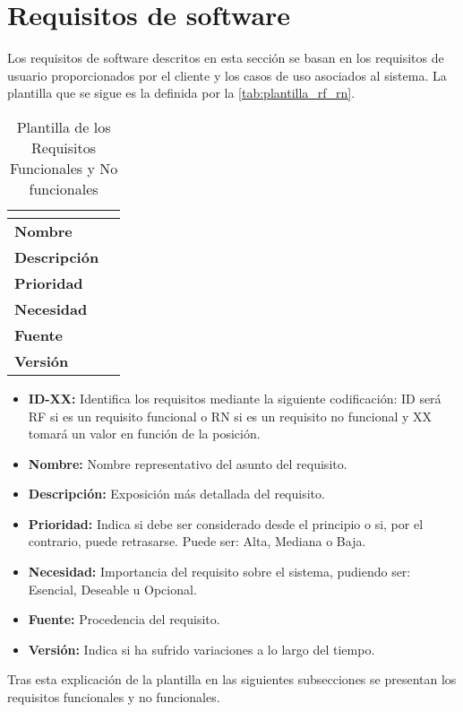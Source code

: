 \section{Requisitos de software}\label{sec:requisitos-de-software}
Los requisitos de software descritos en esta sección se basan en los requisitos de usuario proporcionados por el cliente y los casos de uso asociados al sistema. La plantilla que se sigue es la definida por la \autoref{tab:plantilla_rf_rn}.
\begin{table}[H]
	\caption{Plantilla de los Requisitos Funcionales y No funcionales}
	\label{tab:plantilla_rf_rn}
	\begin{tabular}{|l|p{}|}
		\hline
		\multicolumn{2}{|c|}{\cellcolor[HTML]{BFBFBF}{\color[HTML]{000000} \textbf{ID-XX}}} \\ \hline
		\textbf{Nombre}      &   \\ \hline
		\textbf{Descripción} &   \\ \hline
		\textbf{Prioridad}   &   \\ \hline
		\textbf{Necesidad}   &   \\ \hline
		\textbf{Fuente}      &   \\ \hline
		\textbf{Versión}     &   \\ \hline
	\end{tabular}
\end{table}
\begin{itemize}
	\item \textbf{ID-XX:} Identifica los requisitos mediante la siguiente codificación: ID será RF si es un requisito funcional o RN si es un requisito no funcional y XX tomará un valor en función de la posición.
	\item \textbf{Nombre:} Nombre representativo del asunto del requisito.
	\item \textbf{Descripción:} Exposición más detallada del requisito.
	\item \textbf{Prioridad:} Indica si debe ser considerado desde el principio o si, por el contrario, puede retrasarse. Puede ser: Alta, Mediana o Baja.
	\item \textbf{Necesidad:} Importancia del requisito sobre el sistema, pudiendo ser: Esencial, Deseable u Opcional.
	\item \textbf{Fuente:} Procedencia del requisito.
	\item \textbf{Versión:} Indica si ha sufrido variaciones a lo largo del tiempo.
\end{itemize}

Tras esta explicación de la plantilla en las siguientes subsecciones se presentan los requisitos funcionales y no funcionales.
